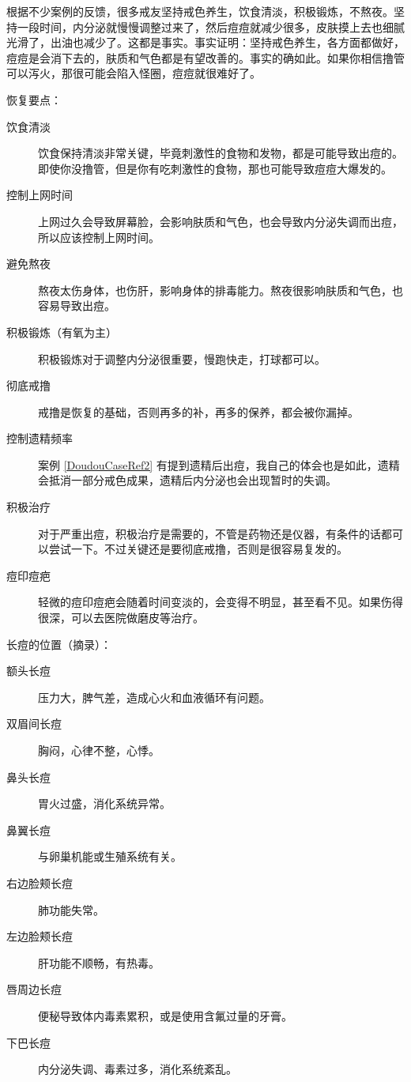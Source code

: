 \documentclass{ctexart}
\begin{document}
根据不少案例的反馈，很多戒友坚持戒色养生，饮食清淡，积极锻炼，不熬夜。坚持一段时间，内分泌就慢慢调整过来了，然后痘痘就减少很多，皮肤摸上去也细腻光滑了，出油也减少了。这都是事实。事实证明：坚持戒色养生，各方面都做好，痘痘是会消下去的，肤质和气色都是有望改善的。事实的确如此。如果你相信撸管可以泻火，那很可能会陷入怪圈，痘痘就很难好了。

恢复要点：

\begin{description}
    \item[饮食清淡] 饮食保持清淡非常关键，毕竟刺激性的食物和发物，都是可能导致出痘的。即使你没撸管，但是你有吃刺激性的食物，那也可能导致痘痘大爆发的。
    \item[控制上网时间] 上网过久会导致屏幕脸，会影响肤质和气色，也会导致内分泌失调而出痘，所以应该控制上网时间。
    \item[避免熬夜] 熬夜太伤身体，也伤肝，影响身体的排毒能力。熬夜很影响肤质和气色，也容易导致出痘。
    \item[积极锻炼（有氧为主）] 积极锻炼对于调整内分泌很重要，慢跑快走，打球都可以。
    \item[彻底戒撸] 戒撸是恢复的基础，否则再多的补，再多的保养，都会被你漏掉。
    \item[控制遗精频率] 案例 \ref{DoudouCaseRef2} 有提到遗精后出痘，我自己的体会也是如此，遗精会抵消一部分戒色成果，遗精后内分泌也会出现暂时的失调。
    \item[积极治疗] 对于严重出痘，积极治疗是需要的，不管是药物还是仪器，有条件的话都可以尝试一下。不过关键还是要彻底戒撸，否则是很容易复发的。
    \item[痘印痘疤] 轻微的痘印痘疤会随着时间变淡的，会变得不明显，甚至看不见。如果伤得很深，可以去医院做磨皮等治疗。
\end{description}

长痘的位置（摘录）：

\begin{description}
    \item[额头长痘] 压力大，脾气差，造成心火和血液循环有问题。
    \item[双眉间长痘] 胸闷，心律不整，心悸。
    \item[鼻头长痘] 胃火过盛，消化系统异常。
    \item[鼻翼长痘] 与卵巢机能或生殖系统有关。
    \item[右边脸颊长痘] 肺功能失常。
    \item[左边脸颊长痘] 肝功能不顺畅，有热毒。
    \item[唇周边长痘] 便秘导致体内毒素累积，或是使用含氟过量的牙膏。
    \item[下巴长痘] 内分泌失调、毒素过多，消化系统紊乱。
\end{description}
\end{document}
